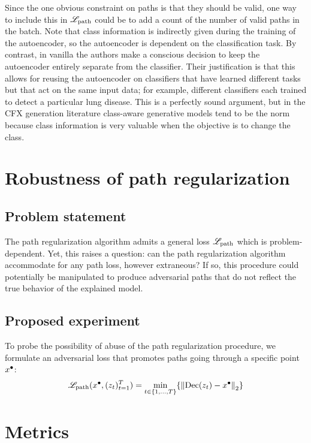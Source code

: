 \documentclass[../main.tex]{subfiles}
\begin{document}
Since the one obvious constraint on paths is that they should be valid, one way to include this in $\mathscr{L}_\text{path}$ could be to add a count of the number of valid paths in the batch.
Note that class information is indirectly given during the training of the autoencoder, so the autoencoder is dependent on the classification task.
By contrast, in vanilla \ls{} the authors make a conscious decision to keep the autoencoder entirely separate from the classifier.
Their justification is that this allows for reusing the autoencoder on classifiers that have learned different tasks but that act on the same input data; for example, different classifiers each trained to detect a particular lung disease.
This is a perfectly sound argument, but in the CFX generation literature class-aware generative models tend to be the norm because class information is very valuable when the objective is to change the class.

\section{Robustness of path regularization}
\label{methods:robustness}

\subsection{Problem statement}

The path regularization algorithm admits a general loss $\mathscr{L}_\text{path}$ which is problem-dependent.
Yet, this raises a question: can the path regularization algorithm accommodate for any path loss, however extraneous?
If so, this procedure could potentially be manipulated to produce adversarial paths that do not reflect the true behavior of the explained model.

\subsection{Proposed experiment}

To probe the possibility of abuse of the path regularization procedure, we formulate an adversarial loss that promotes paths going through a specific point $x^\bullet$:
\begin{align}
    \mathscr{L}_\text{path}(x^\bullet, (z_t)_{t=1}^T) = \min_{t \in \{1, \ldots, T\}} \{ \left\lVert\operatorname{Dec}(z_t) - x^\bullet\right\rVert_2 \}
\end{align}

\section{Metrics}
\end{document}
